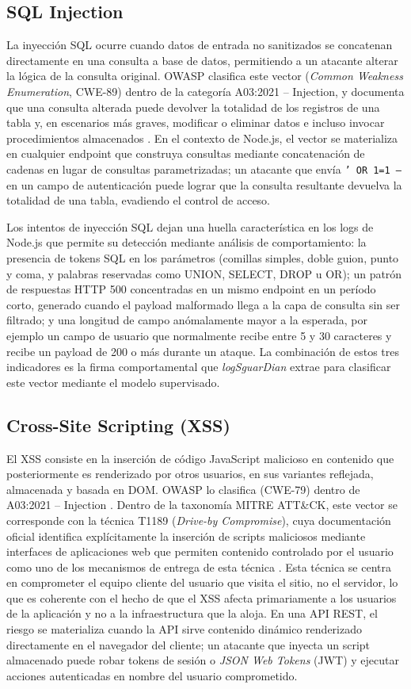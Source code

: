 \subsection{SQL Injection}
La inyección SQL ocurre cuando datos de entrada no sanitizados se concatenan directamente en
una consulta a base de datos, permitiendo a un atacante alterar la lógica de la consulta original.
OWASP clasifica este vector (\textit{Common Weakness Enumeration}, CWE-89) dentro de la categoría A03:2021 -- Injection, y documenta
que una consulta alterada puede devolver la totalidad de los registros de una tabla y, en
escenarios más graves, modificar o eliminar datos e incluso invocar procedimientos almacenados
\cite{owaspa03_2021}. En el contexto de Node.js, el vector se materializa en cualquier endpoint
que construya consultas mediante concatenación de cadenas en lugar de consultas parametrizadas;
un atacante que envía \texttt{' OR 1=1 --} en un campo de autenticación puede lograr que la
consulta resultante devuelva la totalidad de una tabla, evadiendo el control de acceso.

Los intentos de inyección SQL dejan una huella característica en los logs de Node.js que permite
su detección mediante análisis de comportamiento: la presencia de tokens SQL en los parámetros
(comillas simples, doble guion, punto y coma, y palabras reservadas como UNION, SELECT, DROP
u OR); un patrón de respuestas HTTP 500 concentradas en un mismo endpoint en un período corto,
generado cuando el payload malformado llega a la capa de consulta sin ser filtrado; y una longitud
de campo anómalamente mayor a la esperada, por ejemplo un campo de usuario que normalmente
recibe entre 5 y 30 caracteres y recibe un payload de 200 o más durante un ataque. La combinación
de estos tres indicadores es la firma comportamental que \textit{logSguarDian} extrae para
clasificar este vector mediante el modelo supervisado.

\subsection{Cross-Site Scripting (XSS)}
El XSS consiste en la inserción de código JavaScript malicioso en contenido que posteriormente es
renderizado por otros usuarios, en sus variantes reflejada, almacenada y basada en DOM. OWASP
lo clasifica (CWE-79) dentro de A03:2021 -- Injection \cite{owaspa03_2021}. Dentro de la
taxonomía MITRE ATT\&CK, este vector se corresponde con la técnica T1189
(\textit{Drive-by Compromise}), cuya documentación oficial identifica explícitamente la inserción
de scripts maliciosos mediante interfaces de aplicaciones web que permiten contenido controlado
por el usuario como uno de los mecanismos de entrega de esta técnica \cite{mitret1189}. Esta
técnica se centra en comprometer el equipo cliente del usuario que visita el sitio, no el servidor,
lo que es coherente con el hecho de que el XSS afecta primariamente a los usuarios de la
aplicación y no a la infraestructura que la aloja. En una API REST, el riesgo se materializa
cuando la API sirve contenido dinámico renderizado directamente en el navegador del cliente; un atacante que inyecta un script
almacenado puede robar tokens de sesión o \textit{JSON Web Tokens} (JWT) y ejecutar acciones autenticadas en nombre del
usuario comprometido.

